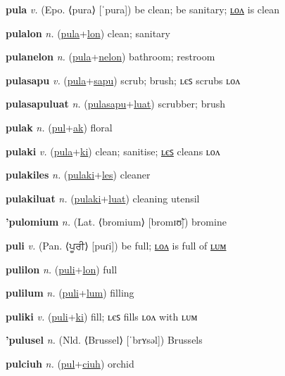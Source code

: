 \textbf{\hypertarget{pula}{pula}} \textit{v.} (Epo. ⟨pura⟩ [ˈpura])
be clean; be sanitary; \hyperlink{pulalon}{ʟᴏᴧ} is clean

\textbf{\hypertarget{pulalon}{pulalon}} \textit{n.} (\hyperlink{pula}{pula}+\allowbreak \hyperlink{lon}{lon})
clean; sanitary

\textbf{\hypertarget{pulanelon}{pulanelon}} \textit{n.} (\hyperlink{pula}{pula}+\allowbreak \hyperlink{nelon}{nelon})
bathroom; restroom

\textbf{\hypertarget{pulasapu}{pulasapu}} \textit{v.} (\hyperlink{pula}{pula}+\allowbreak \hyperlink{sapu}{sapu})
scrub; brush; ʟєꜱ scrubs ʟᴏᴧ

\textbf{\hypertarget{pulasapuluat}{pulasapuluat}} \textit{n.} (\hyperlink{pulasapu}{pulasapu}+\allowbreak \hyperlink{luat}{luat})
scrubber; brush

\textbf{\hypertarget{pulak}{pulak}} \textit{n.} (\hyperlink{pul}{pul}+\allowbreak \hyperlink{ak}{ak})
floral

\textbf{\hypertarget{pulaki}{pulaki}} \textit{v.} (\hyperlink{pula}{pula}+\allowbreak \hyperlink{ki}{ki})
clean; sanitise; \hyperlink{pulakiles}{ʟєꜱ} cleans ʟᴏᴧ

\textbf{\hypertarget{pulakiles}{pulakiles}} \textit{n.} (\hyperlink{pulaki}{pulaki}+\allowbreak \hyperlink{les}{les})
cleaner

\textbf{\hypertarget{pulakiluat}{pulakiluat}} \textit{n.} (\hyperlink{pulaki}{pulaki}+\allowbreak \hyperlink{luat}{luat})
cleaning utensil

\textbf{\hypertarget{'pulomium}{'pulomium}} \textit{n.} (Lat. ⟨bromium⟩ [bromɪʊ̃])
bromine

\textbf{\hypertarget{puli}{puli}} \textit{v.} (Pan. ⟨{\gurmukhi{}ਪੂਰੀ}⟩ [puɾi])
be full; \hyperlink{pulilon}{ʟᴏᴧ} is full of \hyperlink{pulilum}{ʟᴜᴍ}

\textbf{\hypertarget{pulilon}{pulilon}} \textit{n.} (\hyperlink{puli}{puli}+\allowbreak \hyperlink{lon}{lon})
full

\textbf{\hypertarget{pulilum}{pulilum}} \textit{n.} (\hyperlink{puli}{puli}+\allowbreak \hyperlink{lum}{lum})
filling

\textbf{\hypertarget{puliki}{puliki}} \textit{v.} (\hyperlink{puli}{puli}+\allowbreak \hyperlink{ki}{ki})
fill; ʟєꜱ fills ʟᴏᴧ with ʟᴜᴍ

\textbf{\hypertarget{'pulusel}{'pulusel}} \textit{n.} (Nld. ⟨Brussel⟩ [ˈbrʏsəl])
Brussels

\textbf{\hypertarget{pulciuh}{pulciuh}} \textit{n.} (\hyperlink{pul}{pul}+\allowbreak \hyperlink{ciuh}{ciuh})
orchid

